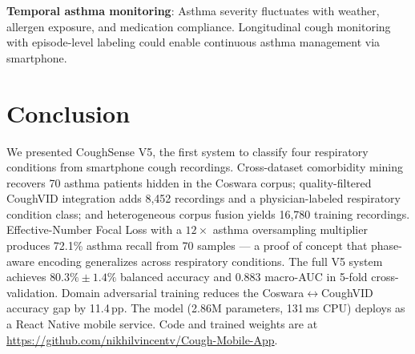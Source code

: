 \documentclass[journal]{IEEEtran}
\begin{document}
\textbf{Temporal asthma monitoring}: Asthma severity fluctuates with
weather, allergen exposure, and medication compliance. Longitudinal
cough monitoring with episode-level labeling could enable continuous
asthma management via smartphone.

\section{Conclusion}
\label{sec:conclusion}

We presented CoughSense V5, the first system to classify four
respiratory conditions from smartphone cough recordings.
Cross-dataset comorbidity mining recovers 70 asthma patients
hidden in the Coswara corpus; quality-filtered CoughVID integration
adds 8,452 recordings and a physician-labeled respiratory condition
class; and heterogeneous corpus fusion yields 16,780 training
recordings. Effective-Number Focal Loss with a $12{\times}$
asthma oversampling multiplier produces 72.1\% asthma recall
from 70 samples — a proof of concept that phase-aware encoding
generalizes across respiratory conditions. The full V5 system
achieves $\mathbf{80.3\%\pm1.4\%}$ balanced accuracy and
$\mathbf{0.883}$ macro-AUC in 5-fold cross-validation.
Domain adversarial training reduces the Coswara$\leftrightarrow$CoughVID
accuracy gap by 11.4\,pp. The model (2.86M parameters, 131\,ms CPU)
deploys as a React Native mobile service.
Code and trained weights are at
\url{https://github.com/nikhilvincentv/Cough-Mobile-App}.
\end{document}
